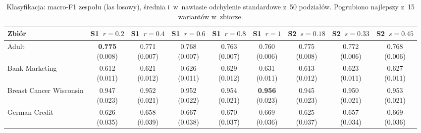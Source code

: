 {\scriptsize\setlength{\tabcolsep}{1.5pt}
\begin{longtable}{lcccccccc}
\caption{Klasyfikacja: macro-F1 zespołu (las losowy), średnia i~w~nawiasie odchylenie standardowe z~50 podziałów. Pogrubiono najlepszy z~15 wariantów w~zbiorze.}\\
\toprule
\textbf{Zbiór} & S1~$r=0.2$ & S1~$r=0.4$ & S1~$r=0.6$ & S1~$r=0.8$ & S1~$r=1$ & S2~$s=0.18$ & S2~$s=0.33$ & S2~$s=0.45$ \\
\midrule
\endhead
Adult & \makecell{\textbf{0.775}\\{\tiny (0.008)}} & \makecell{0.771\\{\tiny (0.007)}} & \makecell{0.768\\{\tiny (0.007)}} & \makecell{0.763\\{\tiny (0.007)}} & \makecell{0.760\\{\tiny (0.006)}} & \makecell{0.775\\{\tiny (0.008)}} & \makecell{0.772\\{\tiny (0.006)}} & \makecell{0.768\\{\tiny (0.006)}} \\
Bank Marketing & \makecell{0.612\\{\tiny (0.011)}} & \makecell{0.621\\{\tiny (0.012)}} & \makecell{0.626\\{\tiny (0.011)}} & \makecell{0.629\\{\tiny (0.012)}} & \makecell{0.631\\{\tiny (0.011)}} & \makecell{0.613\\{\tiny (0.012)}} & \makecell{0.623\\{\tiny (0.011)}} & \makecell{0.627\\{\tiny (0.011)}} \\
Breast Cancer Wisconsin & \makecell{0.947\\{\tiny (0.023)}} & \makecell{0.952\\{\tiny (0.021)}} & \makecell{0.952\\{\tiny (0.022)}} & \makecell{0.954\\{\tiny (0.021)}} & \makecell{\textbf{0.956}\\{\tiny (0.023)}} & \makecell{0.945\\{\tiny (0.023)}} & \makecell{0.950\\{\tiny (0.021)}} & \makecell{0.953\\{\tiny (0.021)}} \\
German Credit & \makecell{0.626\\{\tiny (0.035)}} & \makecell{0.658\\{\tiny (0.039)}} & \makecell{0.667\\{\tiny (0.038)}} & \makecell{0.670\\{\tiny (0.037)}} & \makecell{0.669\\{\tiny (0.036)}} & \makecell{0.625\\{\tiny (0.037)}} & \makecell{0.657\\{\tiny (0.034)}} & \makecell{0.669\\{\tiny (0.036)}} \\

\end{longtable}}
